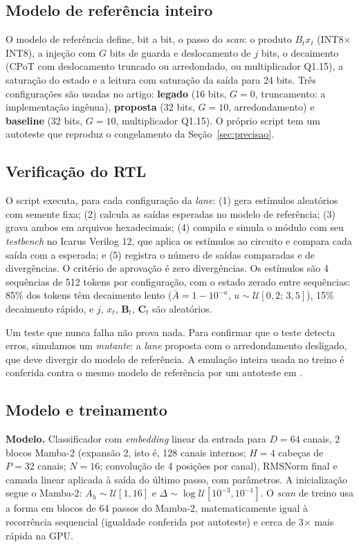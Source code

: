 \documentclass[12pt]{article}
\begin{document}
\subsection{Modelo de referência inteiro}
O modelo de referência define, bit a bit, o passo do \emph{scan}: o produto $B_t x_t$ (INT8$\times$INT8), a injeção com $G$ bits de guarda e deslocamento de $j$ bits, o decaimento (CPoT com deslocamento truncado ou arredondado, ou multiplicador Q1.15), a saturação do estado e a leitura com saturação da saída para 24 bits. Três configurações são usadas no artigo: \textbf{legado} (16 bits, $G=0$, truncamento: a implementação ingênua), \textbf{proposta} (32 bits, $G=10$, arredondamento) e \textbf{baseline} (32 bits, $G=10$, multiplicador Q1.15). O próprio script tem um autoteste que reproduz o congelamento da Seção~\ref{sec:precisao}.

\subsection{Verificação do RTL}
O script  executa, para cada configuração da \emph{lane}: (1) gera estímulos aleatórios com semente fixa; (2) calcula as saídas esperadas no modelo de referência; (3) grava ambos em arquivos hexadecimais; (4) compila e simula o módulo com seu \emph{testbench} no Icarus Verilog 12, que aplica os estímulos ao circuito e compara cada saída com a esperada; e (5) registra o número de saídas comparadas e de divergências. O critério de aprovação é zero divergências. Os estímulos são 4 sequências de 512 tokens por configuração, com o estado zerado entre sequências: 85\% dos tokens têm decaimento lento ($\bar{A} = 1 - 10^{-u}$, $u \sim \mathcal{U}[0{,}2;\,3{,}5]$), 15\% decaimento rápido, e $j$, $x_t$, $\mathbf{B}_t$, $\mathbf{C}_t$ são aleatórios.

Um teste que nunca falha não prova nada. Para confirmar que o teste detecta erros, simulamos um \emph{mutante}: a \emph{lane} proposta com o arredondamento desligado, que deve divergir do modelo de referência. A emulação inteira usada no treino é conferida contra o mesmo modelo de referência por um autoteste em .

\subsection{Modelo e treinamento}
\label{sec:qat}
\textbf{Modelo.} Classificador com \emph{embedding} linear da entrada para $D=64$ canais, 2 blocos Mamba-2 (expansão 2, isto é, 128 canais internos; $H=4$ cabeças de $P=32$ canais; $N=16$; convolução de 4 posições por canal), RMSNorm final e camada linear aplicada à saída do último passo, com \NParams{} parâmetros. A inicialização segue o Mamba-2: $A_h \sim \mathcal{U}[1,16]$ e $\Delta \sim \log\mathcal{U}[10^{-3}, 10^{-1}]$. O \emph{scan} de treino usa a forma em blocos de 64 passos do Mamba-2, matematicamente igual à recorrência sequencial (igualdade conferida por autoteste) e cerca de 3$\times$ mais rápida na GPU.
\end{document}

